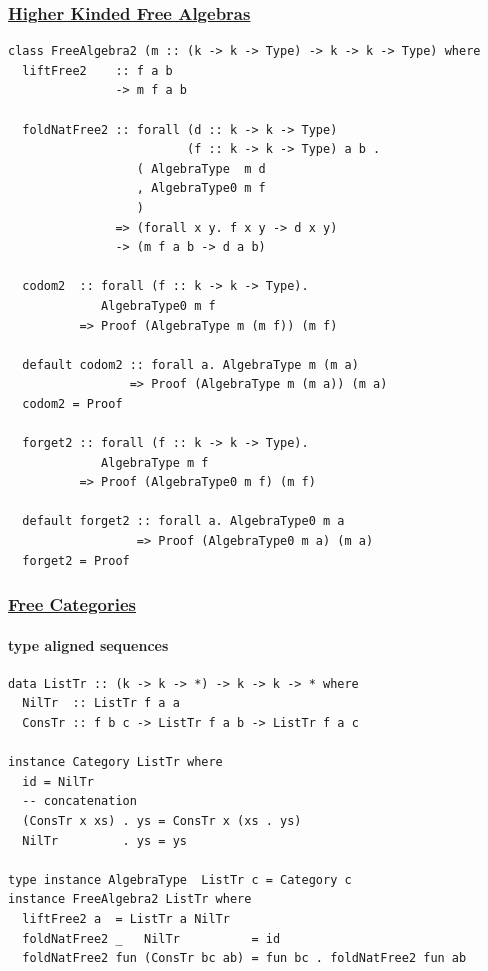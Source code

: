 \documentclass[t,dvipsnames]{beamer}
\begin{document}
\begin{frame}[fragile]
  \frametitle{\underline{Higher Kinded Free Algebras}}
  \begin{verbatim}
class FreeAlgebra2 (m :: (k -> k -> Type) -> k -> k -> Type) where
  liftFree2    :: f a b
               -> m f a b

  foldNatFree2 :: forall (d :: k -> k -> Type)
                         (f :: k -> k -> Type) a b .
                  ( AlgebraType  m d
                  , AlgebraType0 m f
                  )
               => (forall x y. f x y -> d x y)
               -> (m f a b -> d a b)

  codom2  :: forall (f :: k -> k -> Type).
             AlgebraType0 m f
          => Proof (AlgebraType m (m f)) (m f)

  default codom2 :: forall a. AlgebraType m (m a)
                 => Proof (AlgebraType m (m a)) (m a)
  codom2 = Proof

  forget2 :: forall (f :: k -> k -> Type).
             AlgebraType m f
          => Proof (AlgebraType0 m f) (m f)

  default forget2 :: forall a. AlgebraType0 m a
                  => Proof (AlgebraType0 m a) (m a)
  forget2 = Proof
  \end{verbatim}
\end{frame}

\begin{frame}[fragile]
  \frametitle{\underline{Free Categories}}
  \framesubtitle{type aligned sequences}
  \begin{verbatim}
data ListTr :: (k -> k -> *) -> k -> k -> * where
  NilTr  :: ListTr f a a
  ConsTr :: f b c -> ListTr f a b -> ListTr f a c

instance Category ListTr where
  id = NilTr
  -- concatenation
  (ConsTr x xs) . ys = ConsTr x (xs . ys)
  NilTr         . ys = ys

type instance AlgebraType  ListTr c = Category c
instance FreeAlgebra2 ListTr where
  liftFree2 a  = ListTr a NilTr
  foldNatFree2 _   NilTr          = id
  foldNatFree2 fun (ConsTr bc ab) = fun bc . foldNatFree2 fun ab
  \end{verbatim}

\end{frame}
\end{document}
